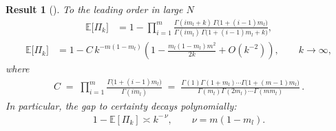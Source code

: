 \documentclass{article}
\newtheorem{theorem}{Result}
\theoremstyle{remark} %
\begin{document}
\begin{theorem}[]\label{thm:scaling_app}
To the leading order in large $N$
\begin{align}
\mathbb{E}\big[\Pi_k\big]
&= 1 - \prod_{i=1}^{m}
\frac{\Gamma(im_l+k)\,\Gamma \big(1+(i-1)m_l\big)}
{\Gamma(im_l)\,\Gamma \big(1+(i-1)m_l+k\big)},
\label{eq:exact}\tag{Exact}
\end{align}
\begin{align}
\mathbb{E}\big[\Pi_k\big]
&= 1 - C\,k^{-m(1-m_l)} \left(1-\frac{m_l(1-m_l)m^2}{2k}+O(k^{-2})\right),
\qquad k\to\infty, \label{eq:asymp}\tag{Asymptotic}
\end{align}
where
\begin{align}
C\;=\;\prod_{i=1}^{m}\frac{\Gamma \big(1+(i-1)m_l\big)}{\Gamma(im_l)}
\;=\;\frac{\Gamma(1)\Gamma(1+m_l)\cdots \Gamma \big(1+(m-1)m_l\big)}
{\Gamma(m_l)\Gamma(2m_l)\cdots \Gamma(mm_l)}\,.
\end{align}
In particular, the \emph{gap to certainty} decays polynomially:
\begin{align}
1-\mathbb{E}[\Pi_k] \asymp k^{-\,\nu}, \qquad \nu=m(1-m_l).
\end{align}
\end{theorem}
\end{document}
